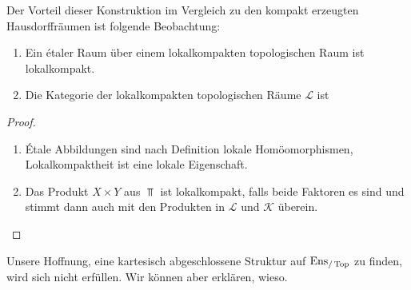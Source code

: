 Der Vorteil dieser Konstruktion im Vergleich zu den kompakt erzeugten
Hausdorffräumen ist folgende Beobachtung:
\begin{prop}
  \begin{enumerate}[label=(\roman*)]
    \item Ein étaler Raum über einem lokalkompakten topologischen Raum
      ist lokalkompakt.
    \item Die Kategorie der lokalkompakten topologischen Räume
      $\mathcal{L}$ ist
  \end{enumerate}
\end{prop}
\begin{proof}
  \begin{enumerate}[label=(\roman*)]
    \item Étale Abbildungen sind nach Definition lokale
      Homöomorphismen, Lokalkompaktheit ist eine lokale Eigenschaft.
    \item Das Produkt $X \times Y$ aus $\Top$ ist lokalkompakt, falls
      beide Faktoren es sind und stimmt dann auch mit den Produkten in
      $\mathcal{L}$ und $\mathcal{K}$ überein.
  \end{enumerate}
\end{proof}

Unsere Hoffnung, eine kartesisch abgeschlossene Struktur auf
$\operatorname{Ens}_{/\operatorname{Top}}$ zu finden, wird sich nicht erfüllen. Wir können aber
erklären, wieso.

